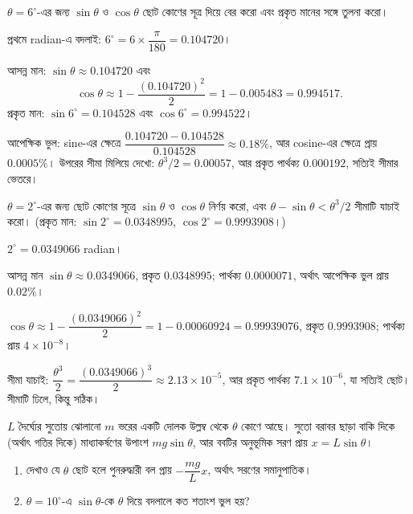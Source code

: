\documentclass[11pt]{article}
\begin{document}
\begin{example}
$\theta = 6^{\circ}$-এর জন্য $\sin\theta$ ও $\cos\theta$ ছোট কোণের সূত্র দিয়ে
বের করো এবং প্রকৃত মানের সঙ্গে তুলনা করো।
\end{example}

\begin{solbox}
প্রথমে radian-এ বদলাই: $6^{\circ} = 6 \times \dfrac{\pi}{180} = 0.104720$।

আসন্ন মান: $\sin\theta \approx 0.104720$ এবং
\[
  \cos\theta \approx 1 - \frac{(0.104720)^{2}}{2} = 1 - 0.005483 = 0.994517 .
\]
প্রকৃত মান: $\sin 6^{\circ} = 0.104528$ এবং $\cos 6^{\circ} = 0.994522$।

আপেক্ষিক ভুল: sine-এর ক্ষেত্রে
$\dfrac{0.104720-0.104528}{0.104528} \approx 0.18\%$, আর cosine-এর ক্ষেত্রে
প্রায় $0.0005\%$। উপরের সীমা মিলিয়ে দেখো: $\theta^{3}/2 = 0.00057$, আর
প্রকৃত পার্থক্য $0.000192$, সত্যিই সীমার ভেতরে।
\end{solbox}

 $\theta = 2^{\circ}$-এর জন্য ছোট কোণের সূত্রে $\sin\theta$ ও
$\cos\theta$ নির্ণয় করো, এবং $\theta - \sin\theta < \theta^{3}/2$ সীমাটি
যাচাই করো। (প্রকৃত মান: $\sin 2^{\circ} = 0.0348995$,
$\cos 2^{\circ} = 0.9993908$।)

\begin{sol}
$2^{\circ} = 0.0349066$ radian।

আসন্ন মান $\sin\theta \approx 0.0349066$, প্রকৃত $0.0348995$; পার্থক্য
$0.0000071$, অর্থাৎ আপেক্ষিক ভুল প্রায় $0.02\%$।

$\cos\theta \approx 1 - \dfrac{(0.0349066)^{2}}{2} = 1 - 0.00060924
= 0.99939076$, প্রকৃত $0.9993908$; পার্থক্য প্রায় $4 \times 10^{-8}$।

সীমা যাচাই: $\dfrac{\theta^{3}}{2} = \dfrac{(0.0349066)^{3}}{2}
\approx 2.13 \times 10^{-5}$, আর প্রকৃত পার্থক্য
$7.1 \times 10^{-6}$, যা সত্যিই ছোট। সীমাটি ঢিলে, কিন্তু সঠিক।
\end{sol}

 $L$ দৈর্ঘ্যের সুতোয় ঝোলানো $m$ ভরের একটি দোলক উল্লম্ব থেকে $\theta$
কোণে আছে। সুতো বরাবর ছাড়া বাকি দিকে (অর্থাৎ গতির দিকে) মাধ্যাকর্ষণের উপাংশ
$mg\sin\theta$, আর ববটির অনুভূমিক সরণ প্রায় $x = L\sin\theta$।
\begin{enumerate}
  \item দেখাও যে $\theta$ ছোট হলে পুনরুদ্ধারী বল প্রায় $-\dfrac{mg}{L}x$,
        অর্থাৎ সরণের সমানুপাতিক।
  \item $\theta = 10^{\circ}$-এ $\sin\theta$-কে $\theta$ দিয়ে বদলালে কত
        শতাংশ ভুল হয়?
\end{enumerate}
\end{document}
